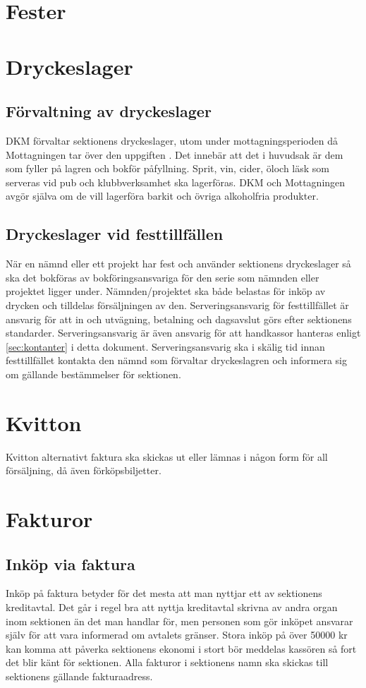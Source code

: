 \documentclass{dgovdoc}
\begin{document}
\section{Fester}

\section{Dryckeslager}
\subsection{Förvaltning av dryckeslager}
DKM förvaltar sektionens dryckeslager, utom under mottagningsperioden då Mottagningen tar över den
uppgiften . Det innebär att det i huvudsak är dem som fyller på lagren och bokför påfyllning. Sprit,
vin, cider, öloch läsk som serveras vid pub­ och klubbverksamhet ska lagerföras. DKM och Mottagningen avgör själva
om de vill lagerföra barkit och övriga alkoholfria produkter.

\subsection{Dryckeslager vid festtillfällen}
När en nämnd eller ett projekt har fest och använder sektionens dryckeslager så ska det bokföras av
bokföringsansvariga för den serie som nämnden eller projektet ligger under. Nämnden/projektet ska både
belastas för inköp av drycken och tilldelas försäljningen av den. Serveringsansvarig för festtillfället är
ansvarig för att in­ och ut­vägning, betalning och dagsavslut görs efter sektionens standarder.
Serveringsansvarig är även ansvarig för att handkassor hanteras enligt \ref{sec:kontanter} i detta dokument.
Serveringsansvarig ska i skälig tid innan festtillfället kontakta den nämnd som förvaltar dryckeslagren och
informera sig om gällande bestämmelser för sektionen.

\section{Kvitton}

Kvitton alternativt faktura ska skickas ut eller lämnas i någon form för all
försäljning, då även förköpsbiljetter.

\section{Fakturor}

\subsection{Inköp via faktura}
Inköp på faktura betyder för det mesta att man nyttjar ett av sektionens kreditavtal. Det går i regel bra att
nyttja kreditavtal skrivna av andra organ inom sektionen än det man handlar för, men personen som gör
inköpet ansvarar själv för att vara informerad om avtalets gränser. Stora inköp på över 50000 kr kan komma
att påverka sektionens ekonomi i stort bör meddelas kassören så fort det blir känt för sektionen. Alla fakturor
i sektionens namn ska skickas till sektionens gällande fakturaadress.
\end{document}
